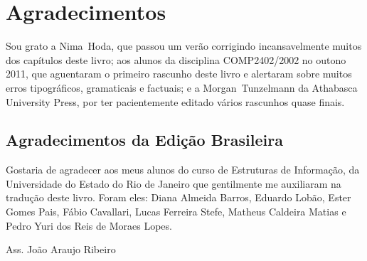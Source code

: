 \chapter*{Agradecimentos}

Sou grato a Nima~Hoda, que passou um verão corrigindo incansavelmente muitos 
dos capítulos deste livro; aos alunos da disciplina COMP2402/2002 no outono 2011, que 
aguentaram o primeiro rascunho deste livro e alertaram sobre muitos erros tipográficos, 
gramaticais e factuais; e a Morgan~Tunzelmann da Athabasca University Press, por ter 
pacientemente editado vários rascunhos quase finais.

\section{Agradecimentos da Edição Brasileira}

Gostaria de agradecer aos meus alunos do curso de Estruturas de Informação, da 
Universidade do Estado do Rio de Janeiro que gentilmente me auxiliaram na tradução
deste livro. Foram eles: Diana Almeida Barros, Eduardo Lobão, Ester Gomes Pais, Fábio Cavallari, Lucas Ferreira Stefe, Matheus Caldeira Matias e Pedro Yuri dos Reis de Moraes Lopes. 

Ass. João Araujo Ribeiro